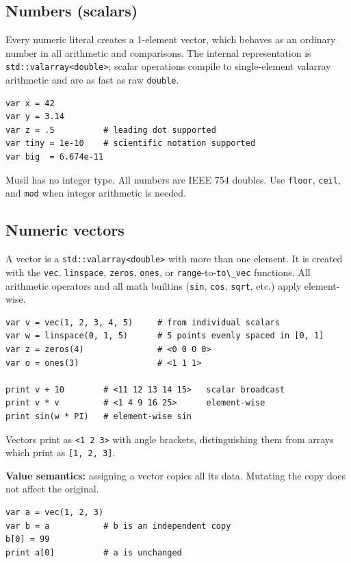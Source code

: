 \documentclass[11pt,a4paper]{article}
\newcommand{\musil}[1]{\lstinline[style=musilinline]{#1}}
\begin{document}
\subsection{Numbers (scalars)}

Every numeric literal creates a 1-element vector, which behaves as an ordinary
number in all arithmetic and comparisons. The internal representation is
\texttt{std::valarray<double>}; scalar operations compile to single-element
valarray arithmetic and are as fast as raw \texttt{double}.

\begin{lstlisting}
var x = 42
var y = 3.14
var z = .5          # leading dot supported
var tiny = 1e-10    # scientific notation supported
var big  = 6.674e-11
\end{lstlisting}

Musil has no integer type. All numbers are IEEE 754 doubles. Use
\musil{floor}, \musil{ceil}, and \musil{mod} when integer arithmetic is needed.

\subsection{Numeric vectors}

A vector is a \texttt{std::valarray<double>} with more than one element. It is
created with the \musil{vec}, \musil{linspace}, \musil{zeros}, \musil{ones}, or
\musil{range}-to-\musil{to\_vec} functions. All arithmetic operators and all math
builtins (\musil{sin}, \musil{cos}, \musil{sqrt}, etc.) apply element-wise.

\begin{lstlisting}
var v = vec(1, 2, 3, 4, 5)     # from individual scalars
var w = linspace(0, 1, 5)      # 5 points evenly spaced in [0, 1]
var z = zeros(4)               # <0 0 0 0>
var o = ones(3)                # <1 1 1>

print v + 10        # <11 12 13 14 15>   scalar broadcast
print v * v         # <1 4 9 16 25>      element-wise
print sin(w * PI)   # element-wise sin
\end{lstlisting}

Vectors print as \texttt{<1 2 3>} with angle brackets, distinguishing them
from arrays which print as \texttt{[1, 2, 3]}.

\textbf{Value semantics:} assigning a vector copies all its data. Mutating the
copy does not affect the original.

\begin{lstlisting}
var a = vec(1, 2, 3)
var b = a           # b is an independent copy
b[0] = 99
print a[0]          # a is unchanged
\end{lstlisting}
\end{document}
